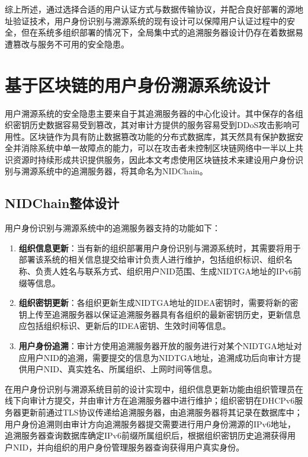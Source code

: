   综上所述，通过选择合适的用户认证方式与数据传输协议，并配合良好部署的源地址验证技术，用户身份识别与溯源系统的现有设计可以保障用户认证过程中的安全，但在系统多组织部署的情况下，全局集中式的追溯服务器设计仍存在着数据易遭篡改与服务不可用的安全隐患。


  \section{基于区块链的用户身份溯源系统设计}
  \label{NIDTGA_Security:design}
  用户溯源系统的安全隐患主要来自于其追溯服务器的中心化设计。其中保存的各组织密钥历史数据容易受到篡改，其对审计方提供的服务容易受到DDoS攻击影响可用性。区块链作为具有防止数据篡改功能的分布式数据库，其天然具有保护数据安全并消除系统中单一故障点的能力，可以在攻击者未控制区块链网络中一半以上共识资源时持续形成共识提供服务，因此本文考虑使用区块链技术来建设用户身份识别与溯源系统中的追溯服务器，将其命名为NIDChain。

    \subsection{NIDChain整体设计}
    \label{NIDTGA_Security:design:architecture}
    用户身份识别与溯源系统中的追溯服务器支持的功能如下：
    \begin{enumerate}[1{)}]
      \item \textbf{组织信息更新}：当有新的组织部署用户身份识别与溯源系统时，其需要将用于部署该系统的相关信息提交给审计负责人进行维护，包括组织标识、组织名称、负责人姓名与联系方式、组织用户NID范围、生成NIDTGA地址的IPv6前缀等信息。
      \item \textbf{组织密钥更新}：各组织更新生成NIDTGA地址的IDEA密钥时，需要将新的密钥上传至追溯服务器以保证追溯服务器具有各组织的最新密钥历史，更新信息应包括组织标识、更新后的IDEA密钥、生效时间等信息。
      \item \textbf{用户身份追溯}：审计方使用追溯服务器开放的服务进行对某个NIDTGA地址对应用户NID的追溯，需要提交的信息为NIDTGA地址，追溯成功后向审计方提供用户NID、真实姓名、所属组织、上网时间等信息。
    \end{enumerate}

    在用户身份识别与溯源系统目前的设计实现中，组织信息更新功能由组织管理员在线下向审计方提交，并由审计方在追溯服务器中进行维护；组织密钥在DHCPv6服务器更新前通过TLS协议传递给追溯服务器，由追溯服务器将其记录在数据库中；用户身份追溯则由审计方向追溯服务器提交需要进行用户身份溯源的IPv6地址，追溯服务器查询数据库确定IPv6前缀所属组织后，根据组织密钥历史追溯获得用户NID，并向组织的用户身份管理服务器查询获得用户真实身份。

